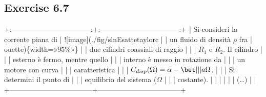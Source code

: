 \documentclass[letterpaper,10pt,italian]{jupyterBook}
\begin{document}
\sphinxstepscope


\subsection{Exercise 6.7}
\label{\detokenize{polimi/fluidmechanics-ita/template/capitoli/06_slnEsatte/0606in:exercise-6-7}}\label{\detokenize{polimi/fluidmechanics-ita/template/capitoli/06_slnEsatte/0606in:fluid-mechanics-exact-solutions-ex07}}\label{\detokenize{polimi/fluidmechanics-ita/template/capitoli/06_slnEsatte/0606in::doc}}
\sphinxAtStartPar
+:———————————:+:———————————:+
| Si consideri la corrente piana di | !{[}image{]}(./fig/slnEsatte\sphinxhyphen{}taylor\sphinxhyphen{}c |
| un fluido di densità \(\rho\) fra   | ouette)\{width=»95\%»\}              |
| due cilindri coassiali di raggio  |                                   |
| \(R_1\) e \(R_2\). Il cilindro        |                                   |
| esterno è fermo, mentre quello    |                                   |
| interno è messo in rotazione da   |                                   |
| un motore con curva               |                                   |
| caratteristica                    |                                   |
| \(C_{disp}(\Omega) = \alpha - \bet |                                   |
| a \Omega\).                        |                                   |
| Si determini il punto di          |                                   |
| equilibrio del sistema (\(\Omega\)  |                                   |
| costante).                        |                                   |
|                                   |                                   |
| (…)                             |                                   |
+———————————–+———————————–+
\end{document}
